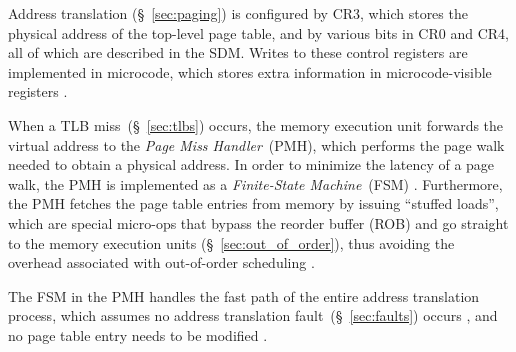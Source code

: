 Address translation (\S~\ref{sec:paging}) is configured by CR3, which stores
the physical address of the top-level page table, and by various bits in CR0
and CR4, all of which are described in the SDM. Writes to these control
registers are implemented in microcode, which stores extra information in
microcode-visible registers \cite{intel2009pipeline}.


When a TLB miss~(\S~\ref{sec:tlbs}) occurs, the memory execution unit forwards
the virtual address to the \textit{Page Miss Handler}~(PMH), which performs the
page walk needed to obtain a physical address. In order to minimize the latency
of a page walk, the PMH is implemented as a \textit{Finite-State Machine}~(FSM)
\cite{hildesheim2014ptm, raikin2014tlb}. Furthermore, the PMH fetches the
page table entries from memory by issuing ``stuffed loads'', which are special
micro-ops that bypass the reorder buffer (ROB) and go straight to the memory
execution units (\S~\ref{sec:out_of_order}), thus avoiding the overhead
associated with out-of-order scheduling
\cite{intel1997pmh, intel1997microspace, hildesheim2014ptm}.


The FSM in the PMH handles the fast path of the entire address translation
process, which assumes no address translation fault~(\S~\ref{sec:faults})
occurs
\cite{intel1996dtlb, intel1997pmh, intel1999exceptions, intel1999events}, and
no page table entry needs to be modified \cite{intel1997pmh}.

